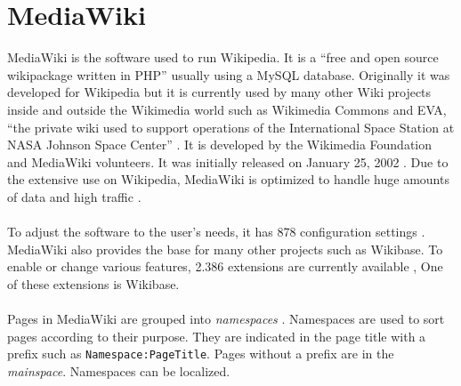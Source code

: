 \section{MediaWiki}

MediaWiki is the software used to run Wikipedia. It is a ``free and open source wikipackage written in PHP'' \citep{wiki:13} usually using a MySQL database. Originally it was developed for Wikipedia but it is currently used by many other Wiki projects inside and outside the Wikimedia world such as Wikimedia Commons and EVA, ``the private wiki used to support operations of the International Space Station at NASA Johnson Space Center'' \citep{eva-nasa}. It is developed by the Wikimedia Foundation and MediaWiki volunteers. It was initially released on January 25, 2002 \citep{wiki:13}. Due to the extensive use on Wikipedia, MediaWiki is optimized to handle huge amounts of data and high traffic \citep{wiki:14}. \\
\\
To adjust the software to the user's needs, it has 878 configuration settings \citep{wiki:15}. \\
MediaWiki also provides the base for many other projects such as Wikibase. To enable or change various features, 2.386 extensions are currently available \citep{wiki:16}, One of these extensions is Wikibase. \\
\\
Pages in MediaWiki are grouped into \textit{namespaces} \citep{wiki:17}. Namespaces are used to sort pages according to their purpose. They are indicated in the page title with a prefix such as \texttt{\justify Namespace:PageTitle}. Pages without a prefix are in the \textit{mainspace}. Namespaces can be localized. 